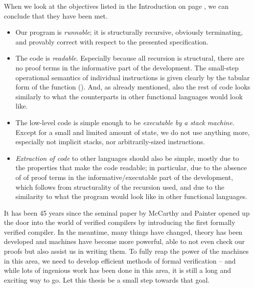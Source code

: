 When we look at the objectives listed in the Introduction on page \pageref{objectives},
we can conclude that they have been met.
\begin{itemize}
	\item Our program is \emph{runnable}; it is structurally recursive,
		obviously terminating, and provably correct with respect to the presented
		specification.
		
	\item The code is \emph{readable}. Especially because all recursion is structural,
		there are no proof terms in the
		informative part of the development. The small-step operational semantics
		of individual instructions is given clearly by the tabular form of the function
		 (). And, as already mentioned,
		also the rest of code looks similarly to what the counterparts in other functional
		languages would look like.
		
	\item The low-level code is simple enough to be \emph{executable by a stack machine}.
		Except for a small and limited amount of state, we do not use anything more,
		especially not implicit stacks, nor arbitrarily-sized instructions.
		
	\item \emph{Extraction of code} to other languages should also be simple, mostly due to
		the properties that make the code readable; in particular, due to the absence of
		of proof terms in the informative/executable part of the development, which follows
		from structurality of the recursion used, and due to the similarity to what
		the program would look like in other functional languages.
\end{itemize}

It has been 45 years since the seminal paper by McCarthy and Painter \cite{mccarthy67}
opened up the door into the world of verified compilers by introducing the first formally
verified compiler. In the meantime, many things have changed, theory has been developed and
machines have become more powerful, able to not even check our proofs but also assist us
in writing them. To fully reap the power of the machines in this area, we need to develop
efficient methods of formal verification -- and while lots of ingenious work has been
done in this area, it is still a long and exciting way to go. Let this thesis be a small
step towards that goal.

